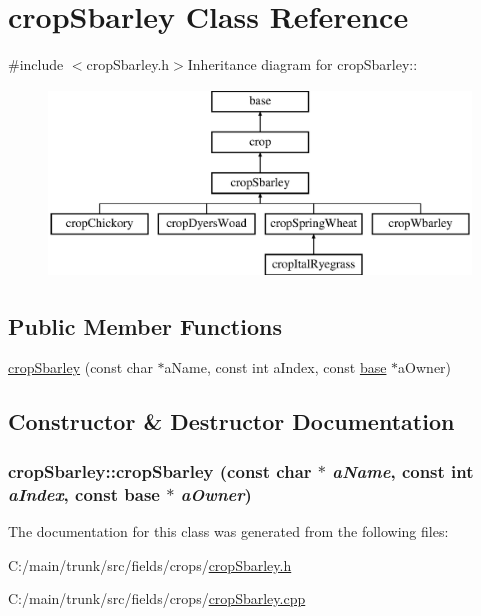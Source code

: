 \hypertarget{classcrop_sbarley}{
\section{cropSbarley Class Reference}
\label{classcrop_sbarley}
}


{\ttfamily \#include $<$cropSbarley.h$>$}Inheritance diagram for cropSbarley::\begin{figure}[H]
\begin{center}
\leavevmode
\includegraphics[height=5cm]{classcrop_sbarley}
\end{center}
\end{figure}
\subsection*{Public Member Functions}
\begin{DoxyCompactItemize}
\item 
\hyperlink{classcrop_sbarley_a9eca2649fd693e3db3c5909da0d54588}{cropSbarley} (const char $\ast$aName, const int aIndex, const \hyperlink{classbase}{base} $\ast$aOwner)
\end{DoxyCompactItemize}


\subsection{Constructor \& Destructor Documentation}
\hypertarget{classcrop_sbarley_a9eca2649fd693e3db3c5909da0d54588}{
\subsubsection[{cropSbarley}]{\setlength{\rightskip}{0pt plus 5cm}cropSbarley::cropSbarley (const char $\ast$ {\em aName}, \/  const int {\em aIndex}, \/  const {\bf base} $\ast$ {\em aOwner})}}
\label{classcrop_sbarley_a9eca2649fd693e3db3c5909da0d54588}


The documentation for this class was generated from the following files:\begin{DoxyCompactItemize}
\item 
C:/main/trunk/src/fields/crops/\hyperlink{crop_sbarley_8h}{cropSbarley.h}\item 
C:/main/trunk/src/fields/crops/\hyperlink{crop_sbarley_8cpp}{cropSbarley.cpp}\end{DoxyCompactItemize}
